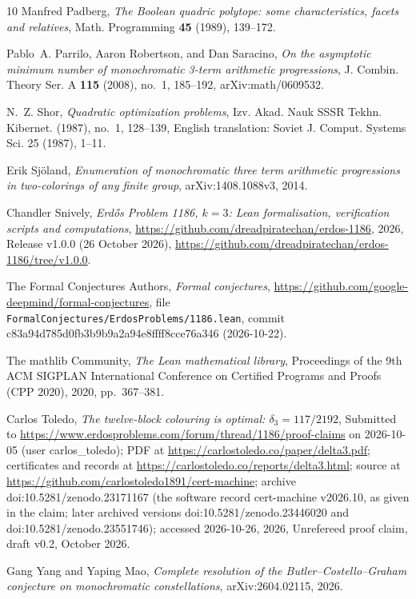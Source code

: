 \documentclass[11pt]{amsart}
\theoremstyle{remark}
\begin{document}
\begin{thebibliography}{10}
Manfred Padberg, \emph{The {B}oolean quadric polytope: some characteristics,
  facets and relatives}, Math. Programming \textbf{45} (1989), 139--172.

Pablo~A. Parrilo, Aaron Robertson, and Dan Saracino, \emph{On the asymptotic
  minimum number of monochromatic 3-term arithmetic progressions}, J. Combin.
  Theory Ser. A \textbf{115} (2008), no.~1, 185--192, arXiv:math/0609532.

N.~Z. Shor, \emph{Quadratic optimization problems}, Izv. Akad. Nauk SSSR Tekhn.
  Kibernet. (1987), no.~1, 128--139, English translation: Soviet J. Comput.
  Systems Sci. 25 (1987), 1--11.

Erik Sj{\"o}land, \emph{Enumeration of monochromatic three term arithmetic
  progressions in two-colorings of any finite group}, arXiv:1408.1088v3, 2014.

Chandler Snively, \emph{Erd{\H{o}}s {P}roblem 1186, $k=3$: {L}ean
  formalisation, verification scripts and computations},
  \url{https://github.com/dreadpiratechan/erdos-1186}, 2026, Release v1.0.0 (26
  October 2026),
  \url{https://github.com/dreadpiratechan/erdos-1186/tree/v1.0.0}.

{The Formal Conjectures Authors}, \emph{Formal conjectures},
  \url{https://github.com/google-deepmind/formal-conjectures}, file
  \texttt{FormalConjectures/ErdosProblems/1186.lean}, commit
  c83a94d785d0fb3b9b9a2a94e8ffff8cce76a346 (2026-10-22).

{The mathlib Community}, \emph{The {L}ean mathematical library}, Proceedings of
  the 9th ACM SIGPLAN International Conference on Certified Programs and Proofs
  (CPP 2020), 2020, pp.~367--381.

Carlos Toledo, \emph{The twelve-block colouring is optimal: $\delta_3 =
  117/2192$}, Submitted to
  \url{https://www.erdosproblems.com/forum/thread/1186/proof-claims} on
  2026-10-05 (user carlos\_toledo); PDF at
  \url{https://carlostoledo.co/paper/delta3.pdf}; certificates and records at
  \url{https://carlostoledo.co/reports/delta3.html}; source at
  \url{https://github.com/carlostoledo1891/cert-machine}; archive
  doi:10.5281/zenodo.23171167 (the software record cert-machine v2026.10, as
  given in the claim; later archived versions doi:10.5281/zenodo.23446020 and
  doi:10.5281/zenodo.23551746); accessed 2026-10-26, 2026, Unrefereed proof
  claim, draft v0.2, October 2026.

Gang Yang and Yaping Mao, \emph{Complete resolution of the
  {B}utler--{C}ostello--{G}raham conjecture on monochromatic constellations},
  arXiv:2604.02115, 2026.

\end{thebibliography}
\end{document}
